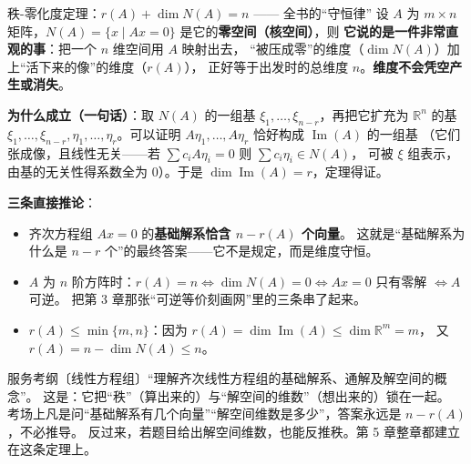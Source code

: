 \begin{fdeep}{秩-零化度定理：$r(A)+\dim N(A)=n$ —— 全书的“守恒律”}
设 $A$ 为 $m\times n$ 矩阵，$N(A)=\{x\mid Ax=0\}$ 是它的\textbf{零空间（核空间）}，则
\textbf{它说的是一件非常直观的事}：把一个 $n$ 维空间用 $A$ 映射出去，
“被压成零”的维度（$\dim N(A)$）加上“活下来的像”的维度（$r(A)$），
正好等于出发时的总维度 $n$。\textbf{维度不会凭空产生或消失}。

\textbf{为什么成立（一句话）}：取 $N(A)$ 的一组基 $\xi_1,\dots,\xi_{n-r}$，再把它扩充为 $\mathbb{R}^n$ 的基
$\xi_1,\dots,\xi_{n-r},\eta_1,\dots,\eta_r$。可以证明 $A\eta_1,\dots,A\eta_r$ 恰好构成 $\operatorname{Im}(A)$ 的一组基
（它们张成像，且线性无关——若 $\sum c_iA\eta_i=0$ 则 $\sum c_i\eta_i\in N(A)$，
可被 $\xi$ 组表示，由基的无关性得系数全为 $0$）。于是 $\dim\operatorname{Im}(A)=r$，定理得证。

\textbf{三条直接推论}：
\begin{itemize}[leftmargin=2.2em,itemsep=0.22em]
\item 齐次方程组 $Ax=0$ 的\textbf{基础解系恰含 $n-r(A)$ 个向量}。
      这就是“基础解系为什么是 $n-r$ 个”的最终答案——它不是规定，而是维度守恒。
\item $A$ 为 $n$ 阶方阵时：$r(A)=n\iff\dim N(A)=0\iff Ax=0$ 只有零解 $\iff A$ 可逆。
      把第 3 章那张“可逆等价刻画网”里的三条串了起来。
\item $r(A)\le\min\{m,n\}$：因为 $r(A)=\dim\operatorname{Im}(A)\le\dim\mathbb{R}^m=m$，
      又 $r(A)=n-\dim N(A)\le n$。
\end{itemize}
\fbref{}服务考纲〔线性方程组〕“理解齐次线性方程组的基础解系、通解及解空间的概念”。
这是：它把“秩”（算出来的）与“解空间的维数”（想出来的）锁在一起。
考场上凡是问“基础解系有几个向量”“解空间维数是多少”，答案永远是 $n-r(A)$，不必推导。
反过来，若题目给出解空间维数，也能反推秩。第 5 章整章都建立在这条定理上。
\end{fdeep}

